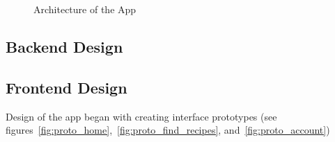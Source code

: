 \begin{figure}
    \centering
    
    \caption{\label{fig:architecture}Architecture of the App}
\end{figure}

\subsection{Backend Design}

\subsection{Frontend Design}
Design of the \chef{} app began with creating interface prototypes (see figures~\ref{fig:proto_home},~\ref{fig:proto_find_recipes}, and~\ref{fig:proto_account})

